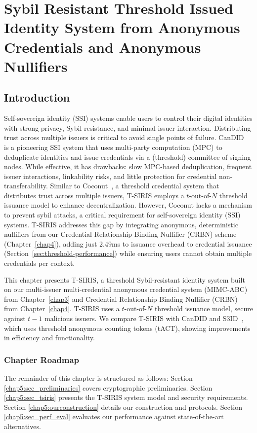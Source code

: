 \chapter{Sybil Resistant Threshold Issued Identity System from Anonymous Credentials and Anonymous Nullifiers}\label{chap5}

\section{Introduction}\label{sec:threshold-intro}
Self-sovereign identity (SSI) systems enable users to control their digital identities with strong privacy, Sybil resistance, and minimal issuer interaction. Distributing trust across multiple issuers is critical to avoid single points of failure. CanDID~\cite{maram_candid_2020} is a pioneering SSI system that uses multi-party computation (MPC) to deduplicate identities and issue credentials via a (threshold) committee of signing nodes. While effective, it has drawbacks: slow MPC-based deduplication, frequent issuer interactions, linkability risks, and little protection for credential non-transferability. Similar to Coconut~\cite{sonnino_coconut_2020}, a threshold credential system that distributes trust across multiple issuers, T-SIRIS employs a $t$-out-of-$N$ threshold issuance model to enhance decentralization. However, Coconut lacks a mechanism to prevent sybil attacks, a critical requirement for self-sovereign identity (SSI) systems. T-SIRIS addresses this gap by integrating anonymous, deterministic nullifiers from our Credential Relationship Binding Nullifier (CRBN) scheme (Chapter~\ref{chap4}), adding just 2.49ms to issuance overhead to credential issuance (Section~\ref{sec:threshold-performance}) while ensuring users cannot obtain multiple credentials per context.

This chapter presents T-SIRIS, a threshold Sybil-resistant identity system built on our multi-issuer multi-credential anonymous credential system (MIMC-ABC) from Chapter~\ref{chap3} and Credential Relationship Binding Nullifier (CRBN) from Chapter~\ref{chap4}. T-SIRIS uses a $t$-out-of-$N$ threshold issuance model, secure against $t-1$ malicious issuers. We compare T-SIRIS with CanDID and S3ID~\cite{rabaninejad_attribute-based_2024}, which uses threshold anonymous counting tokens (tACT), showing improvements in efficiency and functionality.


\subsection*{Chapter Roadmap}
The remainder of this chapter is structured as follows: Section \ref{chap5:sec_preliminaries} covers cryptographic preliminaries. Section \ref{chap5:sec_tsiris} presents the T-SIRIS system model and security requirements. Section \ref{chap5:ourconstruction} details our construction and protocols. Section \ref{chap5:sec_perf_eval} evaluates our performance against state-of-the-art alternatives.

